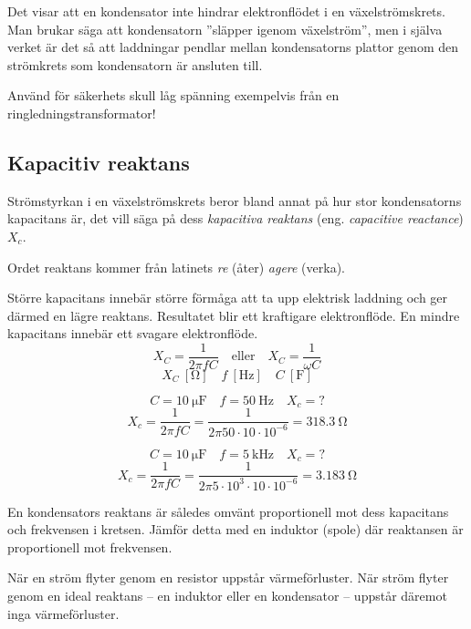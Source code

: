 Det visar att en kondensator inte hindrar elektronflödet i en växelströmskrets.
Man brukar säga att kondensatorn ''släpper igenom växelström'', men i själva 
verket är det så att laddningar pendlar mellan kondensatorns plattor genom den
strömkrets som kondensatorn är ansluten till.

Använd för säkerhets skull låg spänning exempelvis från en
ringledningstransformator!

\subsection{Kapacitiv reaktans}
\label{kapacitiv_reaktans}

Strömstyrkan i en växelströmskrets beror bland annat på hur stor kondensatorns
kapacitans är, det vill säga på dess \emph{kapacitiva reaktans} (eng.
\emph{capacitive reactance}) \(X_c\).

Ordet reaktans kommer från latinets \emph{re} (åter) \emph{agere} (verka).

Större kapacitans innebär större förmåga att ta upp elektrisk laddning och ger
därmed en lägre reaktans. Resultatet blir ett kraftigare elektronflöde.
En mindre kapacitans innebär ett svagare elektronflöde.
\[X_C = \dfrac{1}{2\pi fC}\quad \text{eller}\quad X_C = \dfrac{1}{\omega C}\]
\[X_C\ [\unit{\ohm}]\quad f\ [\unit{\hertz}]\quad C\ [\unit{\farad}]\]
\begin{exempelbox}
\noindent
\[C = \qty{10}{\micro\farad}\quad f = \qty{50}{\hertz}\quad X_c = ?\]
\tcblower
\noindent
\[X_c = \dfrac{1}{2\pi fC} = \dfrac{1}{2\pi 50 \cdot 10 \cdot 10^{-6}} = \qty{318,3}{\ohm}\]
\end{exempelbox}

\begin{exempelbox}
\noindent
\[C = \qty{10}{\micro\farad}\quad f = \qty{5}{\kilo\hertz}\quad X_c = ?\]
\tcblower
\noindent
\[X_c = \dfrac{1}{2\pi fC} = \dfrac{1}{2\pi 5 \cdot 10^3 \cdot 10 \cdot 10^{-6}}
= \qty{3,183}{\ohm}\]
\end{exempelbox}

En kondensators reaktans är således omvänt proportionell mot dess kapacitans
och frekvensen i kretsen.
Jämför detta med en induktor (spole) där reaktansen
är proportionell mot frekvensen.

När en ström flyter genom en resistor uppstår värmeförluster.
När ström flyter genom en ideal reaktans -- en induktor eller en kondensator --
uppstår däremot inga värmeförluster.

